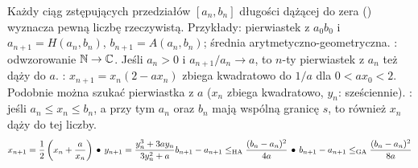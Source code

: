 Każdy ciąg zstępujących  przedziałów $[a_n, b_n]$ długości dążącej do zera () wyznacza pewną liczbę rzeczywistą.
Przykłady: pierwiastek z $a_0b_0$ i $a_{n+1} = H(a_n, b_n)$, $b_{n+1} = A(a_n, b_n)$; średnia arytmetyczno-geometryczna.
: odwzorowanie $\mathbb{N} \to \mathbb{C}$.
Jeśli $a_n > 0$ i $a_{n+1}/a_n \to a$, to $n$-ty pierwiastek z $a_n$ też dąży do $a$.
: $x_{n+1} = x_n(2-ax_n)$ zbiega kwadratowo do $1/a$ dla $0 < a x_0 < 2$.
Podobnie można szukać pierwiastka z $a$ ($x_n$ zbiega kwadratowo, $y_n$: sześciennie).
: jeśli $a_n\le x_n\le b_n$, a przy tym $a_n$ oraz $b_n$ mają wspólną granicę $s$, to również $x_n$ dąży do tej liczby.
\[
	x_{n+1} = \frac{1}{2}\left(x_n+\frac{a}{x_n}\right) \spk
	y_{n+1} = \frac{y_n^3 + 3ay_n}{3y_n^2+a} \hfill
	b_{n+1}-a_{n+1} \le_{\text{HA}} \frac{(b_n-a_n)^2}{4a} \spk
	b_{n+1}-a_{n+1} \le_{\text{GA}} \frac{(b_n-a_n)^2}{8a}
\]

